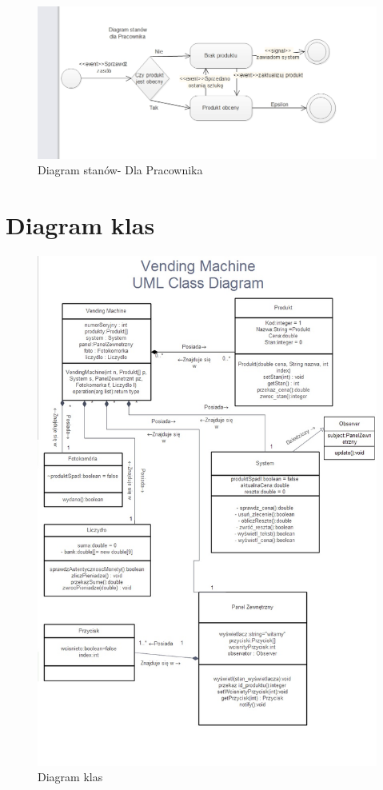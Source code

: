 \documentclass[a4paper, 11pt]{article}
\begin{document}
\begin{figure}[H]
\centerline{\includegraphics[scale=0.9]{../Diagrams/stanyPracownik}}
\caption{Diagram stanów- Dla Pracownika}
\end{figure}


\section{Diagram klas}
\begin{figure}[H]
\centerline{\includegraphics[scale=0.7]{../Diagrams/diagramKlas}}
\caption{Diagram klas}
\end{figure}
\end{document}
